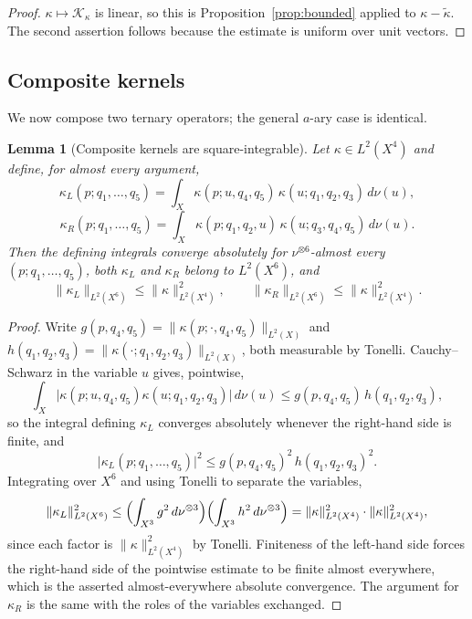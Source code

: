 \documentclass[11pt]{amsart}
\newtheorem{lemma}[theorem]{Lemma}
\theoremstyle{definition}
\theoremstyle{remark}
\newcommand{\norm}[1]{\lVert#1\rVert}
\newcommand{\Kop}{\mathcal K}
\begin{document}
\begin{proof}
$\kappa\mapsto\Kop_\kappa$ is linear, so this is Proposition~\ref{prop:bounded} applied to
$\kappa-\widetilde\kappa$. The second assertion follows because the estimate is uniform
over unit vectors.
\end{proof}

\subsection{Composite kernels}

We now compose two ternary operators; the general $a$-ary case is identical.

\begin{lemma}[Composite kernels are square-integrable]
\label{lem:composite}
Let $\kappa\in L^{2}(X^{4})$ and define, for almost every argument,
\[
 \kappa_L(p;q_1,\ldots,q_5)
 =\int_X\kappa(p;u,q_4,q_5)\,\kappa(u;q_1,q_2,q_3)\,d\nu(u),
\]
\[
 \kappa_R(p;q_1,\ldots,q_5)
 =\int_X\kappa(p;q_1,q_2,u)\,\kappa(u;q_3,q_4,q_5)\,d\nu(u).
\]
Then the defining integrals converge absolutely for
$\nu^{\otimes6}$-almost every $(p;q_1,\ldots,q_5)$, both $\kappa_L$ and $\kappa_R$ belong
to $L^{2}(X^{6})$, and
\[
 \norm{\kappa_L}_{L^{2}(X^{6})}\le\norm{\kappa}_{L^{2}(X^{4})}^{2},
 \qquad
 \norm{\kappa_R}_{L^{2}(X^{6})}\le\norm{\kappa}_{L^{2}(X^{4})}^{2}.
\]
\end{lemma}

\begin{proof}
Write $g(p,q_4,q_5)=\norm{\kappa(p;\cdot,q_4,q_5)}_{L^{2}(X)}$ and
$h(q_1,q_2,q_3)=\norm{\kappa(\cdot;q_1,q_2,q_3)}_{L^{2}(X)}$, both measurable by Tonelli.
Cauchy--Schwarz in the variable $u$ gives, pointwise,
\[
 \int_X\lvert\kappa(p;u,q_4,q_5)\kappa(u;q_1,q_2,q_3)\rvert\,d\nu(u)
 \le g(p,q_4,q_5)\,h(q_1,q_2,q_3),
\]
so the integral defining $\kappa_L$ converges absolutely whenever the right-hand side is
finite, and
\[
 \lvert\kappa_L(p;q_1,\ldots,q_5)\rvert^{2}\le g(p,q_4,q_5)^{2}\,h(q_1,q_2,q_3)^{2}.
\]
Integrating over $X^{6}$ and using Tonelli to separate the variables,
\[
 \norm{\kappa_L}_{L^{2}(X^{6})}^{2}
 \le\Bigl(\int_{X^{3}}g^{2}\,d\nu^{\otimes3}\Bigr)
 \Bigl(\int_{X^{3}}h^{2}\,d\nu^{\otimes3}\Bigr)
 =\norm{\kappa}_{L^{2}(X^{4})}^{2}\cdot\norm{\kappa}_{L^{2}(X^{4})}^{2},
\]
since each factor is $\norm{\kappa}_{L^{2}(X^{4})}^{2}$ by Tonelli. Finiteness of the
left-hand side forces the right-hand side of the pointwise estimate to be finite almost
everywhere, which is the asserted almost-everywhere absolute convergence. The argument for
$\kappa_R$ is the same with the roles of the variables exchanged.
\end{proof}
\end{document}
